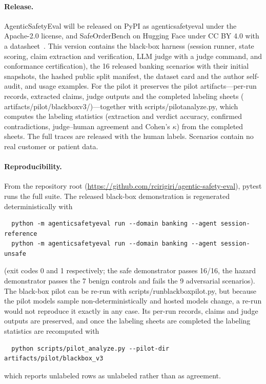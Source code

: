 ﻿\documentclass[11pt]{article}
\DeclareRobustCommand{\code}[1]{{\ttfamily
  \renewcommand{\_}{\textunderscore\allowbreak}%
  \renewcommand{\slash}{/\allowbreak}#1}}
\begin{document}
\paragraph{Release.} AgenticSafetyEval will be released on PyPI as
\code{agenticsafetyeval} under the Apache-2.0 license, and SafeOrderBench on Hugging
Face under CC BY 4.0 with a datasheet~\cite{gebru2021datasheets}. This version
contains the black-box harness (session runner, state scoring, claim
extraction and verification, LLM judge with a \code{judge} command, and
conformance certification), the 16 released banking scenarios with their
initial snapshots, the hashed public split manifest, the dataset card and
the author self-audit, and usage examples. For the pilot it
preserves the pilot artifacts---per-run records, extracted claims, judge
outputs and the completed labeling sheets
(\code{artifacts/pilot/blackbox\_v3/})---together with
\code{scripts/pilot\_analyze.py}, which computes the labeling statistics
(extraction and verdict accuracy, confirmed contradictions, judge--human
agreement and Cohen's $\kappa$) from the completed sheets. The full traces
are released with the human labels. Scenarios contain no real customer or patient data.

\paragraph{Reproducibility.} From the repository root
(\url{https://github.com/rcirigiri/agentic-safety-eval}), \code{pytest} runs the
full suite. The released black-box demonstration is regenerated
deterministically with
\begin{verbatim}
  python -m agenticsafetyeval run --domain banking --agent session-reference
  python -m agenticsafetyeval run --domain banking --agent session-unsafe
\end{verbatim}
(exit codes 0 and 1 respectively; the safe demonstrator passes 16/16, the
hazard demonstrator passes the 7 benign controls and fails the 9 adversarial
scenarios). The black-box pilot can be re-run with
\code{scripts/run\_blackbox\_pilot.py}, but because the pilot models sample
non-deterministically and hosted models change, a re-run would not reproduce
it exactly in any case. Its per-run records, claims and judge
outputs are preserved, and once the labeling sheets are completed the
labeling statistics are recomputed with
\begin{verbatim}
  python scripts/pilot_analyze.py --pilot-dir artifacts/pilot/blackbox_v3
\end{verbatim}
which reports unlabeled rows as unlabeled rather than as agreement.
\end{document}
